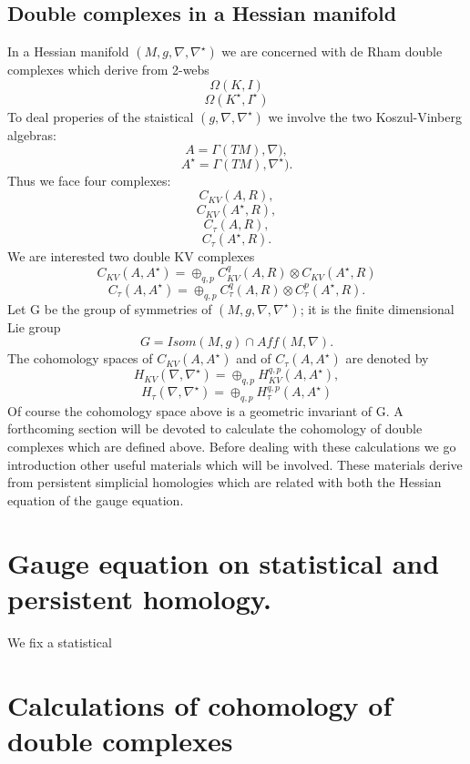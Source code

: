 \subsection{Double complexes in a Hessian manifold}
In a Hessian manifold $(M,g,\nabla,\nabla^\star)$ we are concerned with de Rham double complexes which derive from 2-webs
$$\Omega(K,I)$$
$$\Omega(K^\star,I^\star)$$
To deal properies of the staistical $(g,\nabla,\nabla^\star)$ we involve the two Koszul-Vinberg algebras:
$$A = \Gamma(TM), \nabla),$$
$$A^\star = \Gamma(TM),\nabla^\star).$$
Thus we face four complexes:
$$C_{KV}(A,R),$$
$$C_{KV}(A^\star,R),$$
$$C_\tau(A,R),$$
$$C_\tau(A^\star,R).$$
We are interested two double KV complexes
$$C_{KV}(A,A^\star) = \oplus_{q,p}C^q_{KV}(A,R)\otimes C_{KV}(A^\star,R)$$
$$C_\tau(A,A^\star) = \oplus_{q,p}C^q_\tau(A,R)\otimes C^p_\tau(A^\star,R).$$
Let G be the group of symmetries of $(M,g,\nabla,\nabla^\star)$; it is the finite dimensional Lie group 
$$G = Isom(M,g)\cap Aff(M,\nabla).$$
The cohomology spaces of $C_{KV}(A,A^\star)$ and of $C_\tau(A,A^\star)$ are denoted by
$$H_{KV}(\nabla,\nabla^\star) = \oplus_{q,p}H^{q,p}_{KV}(A,A^\star),$$
$$H_\tau(\nabla,\nabla^\star) = \oplus_{q,p} H^{q,p}_\tau(A,A^\star)$$
Of course the cohomology space above is a geometric invariant of G.
\textit{}A forthcoming section will be devoted to calculate the cohomology of double complexes which are defined above. Before dealing with these calculations we go introduction other useful materials which will be involved. These materials derive from   persistent simplicial homologies which are related with both the Hessian equation of the gauge equation.\\
\section{Gauge equation on statistical and persistent homology.}
We fix a statistical





\section{Calculations of cohomology of double complexes}







